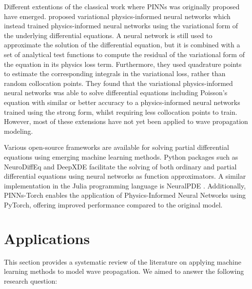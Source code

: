 \documentclass[11pt,twoside]{article}
\begin{document}
Different extentions of the classical work where PINNs was originally proposed have emerged.  
proposed variational physics-informed neural networks which instead trained physics-informed neural networks using the variational form of the 
underlying differential equations. A neural network is still used to approximate the solution of the differential equation, but it is combined 
with a set of analytical test functions to compute the residual of the variational form of the equation in its physics loss term. Furthermore, 
they used quadrature points to estimate the corresponding integrals in the variational loss, rather than random collocation points. They found 
that the variational physics-informed neural networks was able to solve differential equations including Poisson’s equation with similar or 
better accuracy to a physics-informed neural networks trained using the strong form, whilst requiring less collocation points to train. 
However, most of these extensions have not yet been applied to wave propagation modeling.

Various open-source frameworks are available for solving partial differential equations using emerging machine learning methods. Python 
packages such as NeuroDiffEq \citep{chen2020neurodiffeq} and DeepXDE \citep{lu2021deepxde} facilitate the solving of both ordinary and 
partial differential equations using neural networks as function approximators. A similar implementation in the Julia programming language 
is NeuralPDE \citep{https://doi.org/10.48550/arxiv.2107.09443}. Additionally, PINNs-Torch \citep{bafghi_pinns-torch_2023} enables the 
application of Physics-Informed Neural Networks using PyTorch, offering improved performance compared to the original model.

\section{Applications}\label{sec:applications}

This section provides a systematic review of the literature on applying machine learning methods to model 
wave propagation. We aimed to answer the following research question:
\end{document}
